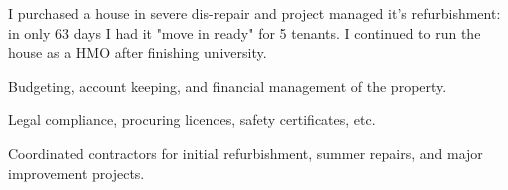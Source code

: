 {}
I purchased a house in severe dis-repair and project managed it's refurbishment: in only 63 days I had it "move in ready" for 5 tenants. I continued to run the house as a HMO after finishing university.
\vspace{0.25em}
\begin{tightemize}
  \item Budgeting, account keeping, and financial management of the property.
  \item Legal compliance, procuring licences, safety certificates, etc.
  \item Coordinated contractors for initial refurbishment, summer repairs, and major improvement projects.
\end{tightemize}
\sectionsep
